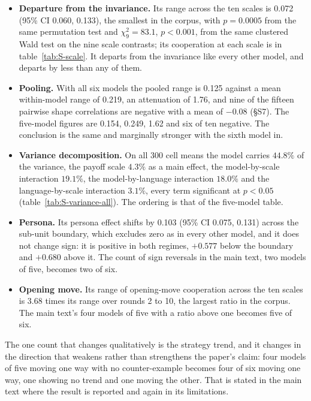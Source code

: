 \documentclass[11pt,a4paper]{article}
\newcommand{\ci}[2]{(95\% CI #1, #2)}
\begin{document}
\begin{itemize}
\item \textbf{Departure from the invariance.} Its range across the ten scales
      is 0.072 \ci{0.060}{0.133}, the smallest in the corpus, with
      $p = 0.0005$ from the same permutation test and
      $\chi^2_9 = 83.1$, $p < 0.001$, from the same clustered Wald test on the
      nine scale contrasts; its cooperation at each scale is in
      table~\ref{tab:S-scale}. It departs from the invariance like every other
      model, and departs by less than any of them.
\item \textbf{Pooling.} With all six models the pooled range is 0.125 against a
      mean within-model range of 0.219, an attenuation of 1.76, and nine of the
      fifteen pairwise shape correlations are negative with a mean of $-0.08$
      (\S S7). The five-model figures are 0.154, 0.249, 1.62 and six of ten
      negative. The conclusion is the same and marginally stronger with the
      sixth model in.
\item \textbf{Variance decomposition.} On all 300 cell means the model carries
      $44.8\%$ of the variance, the payoff scale $4.3\%$ as a main effect, the
      model-by-scale interaction $19.1\%$, the model-by-language interaction
      $18.0\%$ and the language-by-scale interaction $3.1\%$, every term
      significant at $p < 0.05$ (table~\ref{tab:S-variance-all}). The ordering
      is that of the five-model table.
\item \textbf{Persona.} Its persona effect shifts by 0.103 \ci{0.075}{0.131}
      across the sub-unit boundary, which excludes zero as in every other model,
      and it does not change sign: it is positive in both regimes, $+0.577$
      below the boundary and $+0.680$ above it. The count of sign reversals in
      the main text, two models of five, becomes two of six.
\item \textbf{Opening move.} Its range of opening-move cooperation across the
      ten scales is 3.68 times its range over rounds 2 to 10, the largest ratio
      in the corpus. The main text's four models of five with a ratio above one
      becomes five of six.
\end{itemize}

The one count that changes qualitatively is the strategy trend, and it changes
in the direction that weakens rather than strengthens the paper's claim: four
models of five moving one way with no counter-example becomes four of six moving
one way, one showing no trend and one moving the other. That is stated in the
main text where the result is reported and again in its limitations.
\end{document}
